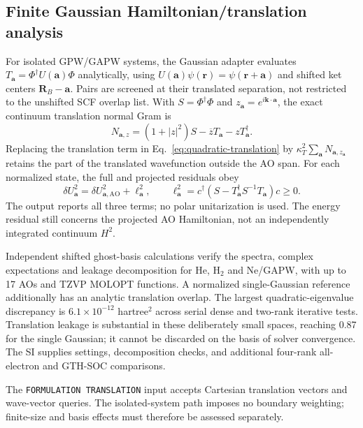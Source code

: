 \subsection{Finite Gaussian Hamiltonian/translation analysis}
For isolated GPW/GAPW systems, the Gaussian adapter evaluates
$T_{\bm a}=\Phi^\dagger U(\bm a)\Phi$ analytically, using
$U(\bm a)\psi(\bm r)=\psi(\bm r+\bm a)$ and shifted ket centers
$\bm R_B-\bm a$. Pairs are screened at their translated separation,
not restricted to the unshifted SCF overlap list. With
$S=\Phi^\dagger\Phi$ and $z_{\bm a}=e^{i\bm k\cdot\bm a}$,
the exact continuum translation normal Gram is
\begin{equation}
 N_{\bm a,z}=(1+|z|^2)S-\overline zT_{\bm a}-zT_{\bm a}^\dagger.
 \label{eq:translation-continuum-gram}
\end{equation}
Replacing the translation term in
Eq.~\eqref{eq:quadratic-translation} by
$\kappa_T^2\sum_{\bm a}N_{\bm a,z_{\bm a}}$ retains the part of
the translated wavefunction outside the AO span. For each normalized
state, the full and projected residuals obey
\begin{equation}
 \delta U_{\bm a}^2=\delta U_{\bm a,\mathrm{AO}}^2+\ell_{\bm a}^2,
 \qquad
 \ell_{\bm a}^2=c^\dagger(S-T_{\bm a}^\dagger S^{-1}T_{\bm a})c\geq0.
 \label{eq:translation-leakage}
\end{equation}
The output reports all three terms; no polar unitarization is used.
The energy residual still concerns the projected AO Hamiltonian,
not an independently integrated continuum $H^2$.

Independent shifted ghost-basis calculations verify the spectra,
complex expectations and leakage decomposition for He, H$_2$ and
Ne/GAPW, with up to 17 AOs and TZVP MOLOPT functions. A normalized
single-Gaussian reference additionally has an analytic translation
overlap. The largest quadratic-eigenvalue discrepancy is
$6.1\times10^{-12}$ hartree$^2$ across serial dense and two-rank
iterative tests. Translation leakage is substantial in these
deliberately small spaces, reaching 0.87 for the single Gaussian;
it cannot be discarded on the basis of solver convergence.
The SI supplies settings, decomposition checks, and additional
four-rank all-electron and GTH-SOC comparisons.

The \texttt{FORMULATION TRANSLATION} input accepts Cartesian
translation vectors and wave-vector queries. The isolated-system
path imposes no boundary weighting; finite-size and basis effects
must therefore be assessed separately.

